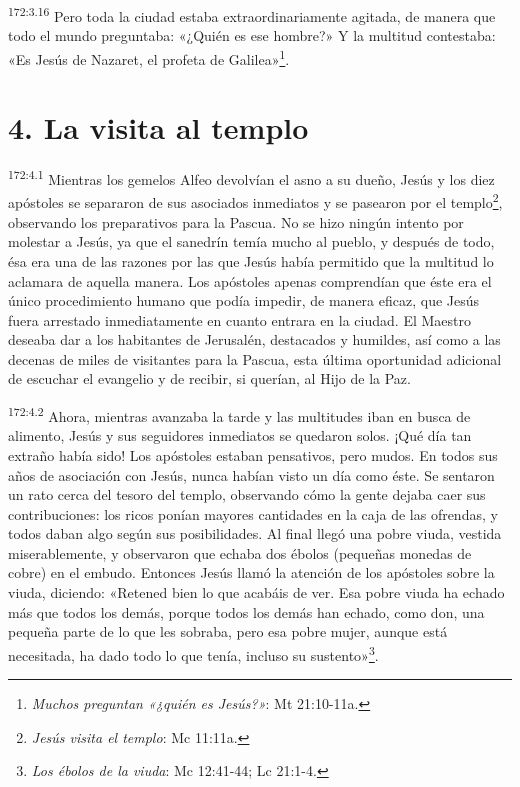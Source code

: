 \par 
\textsuperscript{172:3.16} Pero toda la ciudad estaba extraordinariamente agitada, de manera que todo el mundo preguntaba: «¿Quién es ese hombre?» Y la multitud contestaba: «Es Jesús de Nazaret, el profeta de Galilea»\footnote{\textit{Muchos preguntan «¿quién es Jesús?»}: Mt 21:10-11a.}.

\section*{4. La visita al templo}
\par 
\textsuperscript{172:4.1} Mientras los gemelos Alfeo devolvían el asno a su dueño, Jesús y los diez apóstoles se separaron de sus asociados inmediatos y se pasearon por el templo\footnote{\textit{Jesús visita el templo}: Mc 11:11a.}, observando los preparativos para la Pascua. No se hizo ningún intento por molestar a Jesús, ya que el sanedrín temía mucho al pueblo, y después de todo, ésa era una de las razones por las que Jesús había permitido que la multitud lo aclamara de aquella manera. Los apóstoles apenas comprendían que éste era el único procedimiento humano que podía impedir, de manera eficaz, que Jesús fuera arrestado inmediatamente en cuanto entrara en la ciudad. El Maestro deseaba dar a los habitantes de Jerusalén, destacados y humildes, así como a las decenas de miles de visitantes para la Pascua, esta última oportunidad adicional de escuchar el evangelio y de recibir, si querían, al Hijo de la Paz.

\par 
\textsuperscript{172:4.2} Ahora, mientras avanzaba la tarde y las multitudes iban en busca de alimento, Jesús y sus seguidores inmediatos se quedaron solos. ¡Qué día tan extraño había sido! Los apóstoles estaban pensativos, pero mudos. En todos sus años de asociación con Jesús, nunca habían visto un día como éste. Se sentaron un rato cerca del tesoro del templo, observando cómo la gente dejaba caer sus contribuciones: los ricos ponían mayores cantidades en la caja de las ofrendas, y todos daban algo según sus posibilidades. Al final llegó una pobre viuda, vestida miserablemente, y observaron que echaba dos ébolos
(pequeñas monedas de cobre) en el embudo. Entonces Jesús llamó la atención de los apóstoles sobre la viuda, diciendo: «Retened bien lo que acabáis de ver. Esa pobre viuda ha echado más que todos los demás, porque todos los demás han echado, como don, una pequeña parte de lo que les sobraba, pero esa pobre mujer, aunque está necesitada, ha dado todo lo que tenía, incluso su sustento»\footnote{\textit{Los ébolos de la viuda}: Mc 12:41-44; Lc 21:1-4.}.

